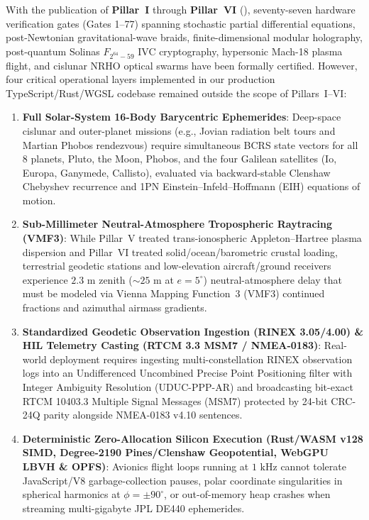 \documentclass[11pt,a4paper,reqno]{article}
\def\texttt#1{#1}%
\def\mathbb#1{#1}%
\theoremstyle{plain}
\theoremstyle{definition}
\theoremstyle{remark}
\numberwithin{equation}{section}
\begin{document}
With the publication of \textbf{Pillar~I} through \textbf{Pillar~VI} (\cite{UnmaniSPDE50,UnmaniAutomata90,UnmaniFiniteDim90,UnmaniTMD12,UnmaniPillarV2026,UnmaniPillarVI2026}), seventy-seven hardware verification gates (\texttt{Gates 1--77}) spanning stochastic partial differential equations, post-Newtonian gravitational-wave braids, finite-dimensional modular holography, post-quantum Solinas $\mathbb{F}_{2^{64}-59}$ IVC cryptography, hypersonic Mach-18 plasma flight, and cislunar NRHO optical swarms have been formally certified. However, four critical operational layers implemented in our production TypeScript/Rust/WGSL codebase remained outside the scope of Pillars~I--VI:
\begin{enumerate}[leftmargin=1.8em,itemsep=2pt]
  \item \textbf{Full Solar-System 16-Body Barycentric Ephemerides}: Deep-space cislunar and outer-planet missions (e.g., Jovian radiation belt tours and Martian Phobos rendezvous) require simultaneous BCRS state vectors for all 8 planets, Pluto, the Moon, Phobos, and the four Galilean satellites (Io, Europa, Ganymede, Callisto), evaluated via backward-stable Clenshaw Chebyshev recurrence and 1PN Einstein--Infeld--Hoffmann (EIH) equations of motion.
  \item \textbf{Sub-Millimeter Neutral-Atmosphere Tropospheric Raytracing (VMF3)}: While Pillar~V treated trans-ionospheric Appleton--Hartree plasma dispersion and Pillar~VI treated solid/ocean/barometric crustal loading, terrestrial geodetic stations and low-elevation aircraft/ground receivers experience $2.3\text{ m}$ zenith ($\sim 25\text{ m}$ at $e = 5^\circ$) neutral-atmosphere delay that must be modeled via Vienna Mapping Function~3 (VMF3) continued fractions and azimuthal airmass gradients.
  \item \textbf{Standardized Geodetic Observation Ingestion (RINEX 3.05/4.00) \& HIL Telemetry Casting (RTCM 3.3 MSM7 / NMEA-0183)}: Real-world deployment requires ingesting multi-constellation RINEX observation logs into an Undifferenced Uncombined Precise Point Positioning filter with Integer Ambiguity Resolution (UDUC-PPP-AR) and broadcasting bit-exact RTCM 10403.3 Multiple Signal Messages (MSM7) protected by 24-bit \texttt{CRC-24Q} parity alongside NMEA-0183 v4.10 sentences.
  \item \textbf{Deterministic Zero-Allocation Silicon Execution (Rust/WASM \texttt{v128} SIMD, Degree-2190 Pines/Clenshaw Geopotential, WebGPU LBVH \& OPFS)}: Avionics flight loops running at $1\text{ kHz}$ cannot tolerate JavaScript/V8 garbage-collection pauses, polar coordinate singularities in spherical harmonics at $\phi = \pm 90^\circ$, or out-of-memory heap crashes when streaming multi-gigabyte JPL DE440 ephemerides.
\end{enumerate}
\end{document}
